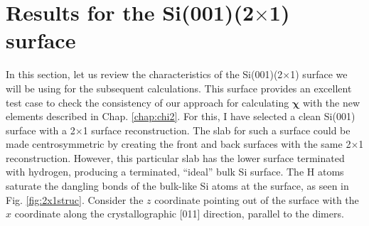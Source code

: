
\section{Results for the \texorpdfstring{Si(001)(2$\times$1)}{Si(001)(2x1)}
surface}\label{sec:Si2x1results}

In this section, let us review the characteristics of the Si(001)(2$\times$1)
surface we will be using for the subsequent calculations. This surface provides
an excellent test case to check the consistency of our approach for calculating
$\boldsymbol{\chi}$ with the new elements described in Chap. \ref{chap:chi2}.
For this, I have selected a clean Si(001) surface with a 2$\times$1 surface
reconstruction. The slab for such a surface could be made centrosymmetric by
creating the front and back surfaces with the same 2$\times$1 reconstruction.
However, this particular slab has the lower surface terminated with hydrogen,
producing a terminated, ``ideal'' bulk Si surface. The H atoms saturate the
dangling bonds of the bulk-like Si atoms at the surface, as seen in Fig.
\ref{fig:2x1struc}. Consider the $z$ coordinate pointing out of the surface with
the $x$ coordinate along the crystallographic [011] direction, parallel to the
dimers.

